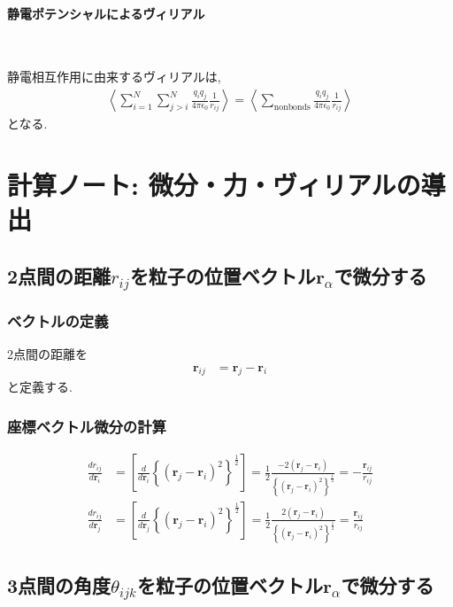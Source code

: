 \paragraph{静電ポテンシャルによるヴィリアル} \

静電相互作用に由来するヴィリアルは,
\begin{align}
  \left\langle
  \sum_{i=1}^{N} \sum_{j > i}^{N}
  \frac{q_{i}q_{j}}{4 \pi \epsilon_{0}}
  \frac{1}{r_{ij}}
  \right\rangle
 =
  \left\langle
  \sum_{\mathrm{nonbonds}}
  \frac{q_{i}q_{j}}{4 \pi \epsilon_{0}}
  \frac{1}{r_{ij}}
  \right\rangle
\end{align}
となる.

\clearpage
\section{計算ノート: 微分・力・ヴィリアルの導出}
\subsection{2点間の距離$r_{ij}$を粒子の位置ベクトル$\bm{r}_{\alpha}$で微分する}
\subsubsection{ベクトルの定義}
2点間の距離を
\begin{align}
   \bm{r}_{ij}
&= \bm{r}_{j} - \bm{r}_{i}
\end{align}
と定義する.

\subsubsection{座標ベクトル微分の計算}
\begin{align}
\frac{d r_{ij}}{d \bm{r}_{i}}
&=
\left[
   \frac{d}{d \bm{r}_{i}}
   \left\{ (\bm{r}_{j} - \bm{r}_{i} )^{2} \right\}^{\frac{1}{2}}
\right]
=
\frac{1}{2}
\frac{ -2 (\bm{r}_{j} - \bm{r}_{i}) }
     { \left\{ ( \bm{r}_{j} - \bm{r}_{i} )^{2} \right\}^{\frac{1}{2}} }
=
-
\frac{\bm{r}_{ij}}{r_{ij}}
\label{Eq:dr_ij-dr_i}
\\
\frac{d r_{ij}}{d \bm{r}_{j}}
&=
\left[
   \frac{d}{d \bm{r}_{j}}
   \left\{ (\bm{r}_{j} - \bm{r}_{i} )^{2} \right\}^{\frac{1}{2}}
\right]
=
\frac{1}{2}
\frac{ 2 (\bm{r}_{j} - \bm{r}_{i}) }
     { \left\{ ( \bm{r}_{j} - \bm{r}_{i} )^{2} \right\}^{\frac{1}{2}} }
=
\frac{\bm{r}_{ij}}{r_{ij}}
\label{Eq:dr_ij-dr_j}
\end{align}

\subsection{3点間の角度$\theta_{ijk}$を粒子の位置ベクトル$\bm{r}_{\alpha}$で微分する}
